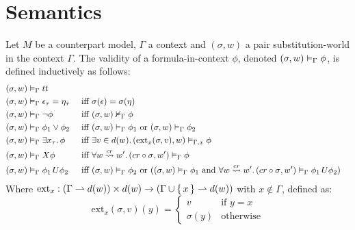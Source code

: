 \section{Semantics}

\begin{definition}
Let $M$ be a counterpart model, $\Gamma$ a context and $(\sigma, w)$ a pair substitution-world in the context $\Gamma$.
The validity of a formula-in-context $\phi$, denoted $({\sigma}, {w}) \vDash_{\Gamma} {\phi}$, is defined inductively as follows:
\begin{align*}
  (\sigma, w) &\vDash_\Gamma tt \\
  (\sigma, w) &\vDash_\Gamma \epsilon_\tau = \eta_\tau &&\text{ iff } \sigma(\epsilon) = \sigma(\eta) \\
  (\sigma, w) &\vDash_\Gamma \neg\phi &&\text{ iff } ({\sigma}, {w}) \nvDash_{\Gamma} {\phi} \\
  (\sigma, w) &\vDash_\Gamma \phi_1 \lor \phi_2
      &&\text{ iff } ({\sigma}, {w}) \vDash_{\Gamma} {\phi_1} \text{ or } ({\sigma}, {w}) \vDash_{\Gamma} {\phi_2} \\
  (\sigma, w) &\vDash_\Gamma \exists {x_\tau} \ldotp {\phi}
      &&\text{ iff } \exists {v \in d(w)} \ldotp {({\text{ext}_x(\sigma, v)}, {w}) \vDash_{\Gamma, x} {\phi}} \\
  (\sigma, w) &\vDash_\Gamma X{\phi}
      &&\text{ iff } \forall {w \overset{cr}{\rightsquigarrow} w'} \ldotp {({cr \circ \sigma}, {w'}) \vDash_{\Gamma} {\phi}} \\
  (\sigma, w) &\vDash_\Gamma {\phi_1}\,U {\phi_2}
      &&\text{ iff } ({\sigma}, {w}) \vDash_{\Gamma} {\phi_2} \text{ or } (({\sigma}, {w}) \vDash_{\Gamma} {\phi_1}
          \text { and } \forall {w \overset{cr}{\rightsquigarrow} w'} \ldotp {({cr \circ \sigma}, {w'}) \vDash_{\Gamma} {{\phi_1}\,U {\phi_2}}}) \\
\end{align*}
  Where $\text{ext}_x : (\Gamma \rightharpoonup d(w)) \times d(w) \to (\Gamma \cup \set{x} \rightharpoonup d(w))$ with
  $x \not\in \Gamma$, defined as:
  \[
    \text{ext}_x(\sigma, v)(y) = \begin{cases} v & \text{if } y = x \\ \sigma(y) & \text{otherwise}\end{cases}
  \]
\end{definition}

